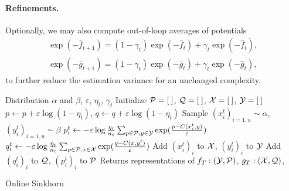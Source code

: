 \paragraph{Refinements.} Optionally, we may also
compute out-of-loop averages of potentials
\begin{align}
    \exp(-\bar f_{t+1}) = (1 - \gamma_t) \exp(-\bar f_t) + \gamma_t \exp(-\hat f_t), \\
    \exp(-\bar g_{t+1}) = (1 - \gamma_t) \exp(-\bar g_t) + \gamma_t \exp(-\hat g_t),
\end{align}
to further reduce the estimation variance for an unchanged complexity.

\begin{algorithm}[t]
    \begin{algorithmic}
    \Input Distribution $\alpha$ and $\beta$, $\varepsilon$, $\eta_t$, $\gamma_t$
    \State Initialize $\mathcal{P} = [\:]$, $\mathcal{Q} = [\:]$, $\mathcal{X} = [\:]$, $\mathcal{Y} = [\:]$
            \State $p \gets p + \varepsilon \log(1 - \eta_t)$,
             \State $q \gets q + \varepsilon \log(1 - \eta_t)$
        \EndFor
        \State Sample $(x_i^t)_{i=1,n} \sim \alpha$, $(y_i^t)_{i=1,n} \sim \beta$
            \State $p_i^t \gets 
            - \varepsilon \log \frac{\eta_t}{n_t} 
            \sum_{p \in \mathcal{P}, y \in \mathcal{Y}} \exp(\frac{p - C(x_i^t, y)}{\varepsilon})$
            \State $q_i^t \gets 
            - \varepsilon \log \frac{\eta_t}{n_t} 
            \sum_{p \in \mathcal{P}, x \in \mathcal{X}} \exp(\frac{q - C(x, y_i^t)}{\varepsilon})$
        \EndFor
        \State Add $(x_i^t)_i$ to $\mathcal{X}$, $(y_i^t)_i$ to $\mathcal{Y}$
        \State Add $(q_i^t)_i$ to $\mathcal{Q}$, $(p_i^t)_i$ to $\mathcal{P}$
    \EndFor
    \State Returns representations of $f_T: (\mathcal{Y}, \mathcal{P})$, $g_T: (\mathcal{X}, \mathcal{Q})$, 
    \end{algorithmic}
    \caption{Online Sinkhorn}\label{alg:online_sinkhorn}
\end{algorithm}







